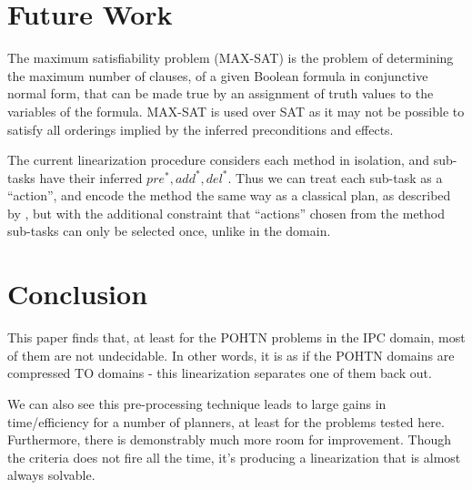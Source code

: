 \documentclass[letterpaper]{article} %
\newcommand{\PreS} {\ensuremath{\mathit{pre^{*}}}}
\newcommand{\AddS} {\ensuremath{\mathit{add^{*}}}}
\newcommand{\DelS} {\ensuremath{\mathit{del^{*}}}}
\begin{document}
\section{Future Work}
The maximum satisfiability problem (MAX-SAT) is the problem of determining the maximum number of clauses, of a given Boolean formula in conjunctive normal form, that can be made true by an assignment of truth values to the variables of the formula. MAX-SAT is used over SAT as it may not be possible to satisfy all orderings implied by the inferred preconditions and effects.

The current linearization procedure considers each method in isolation, and sub-tasks have their inferred $\PreS, \AddS, \DelS$. Thus we can treat each sub-task as a \enquote{action}, and encode the method the same way as a classical plan, as described by \cite{RINTANEN201245}, but with the additional constraint that \enquote{actions} chosen from the method sub-tasks can only be selected once, unlike in the domain.







\section{Conclusion}


This paper finds that, at least for the POHTN problems in the IPC domain, most of them are not undecidable. In other words, it is as if the POHTN domains are compressed TO domains - this linearization separates one of them back out.

We can also see this pre-processing technique leads to large gains in time/efficiency for a number of planners, at least for the problems tested here. Furthermore, there is demonstrably much more room for improvement. Though the criteria does not fire all the time, it's producing a linearization that is almost always solvable.
\end{document}
